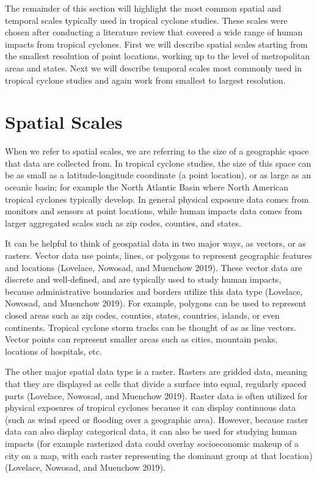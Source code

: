 \documentclass[
]{article}
\begin{document}
The remainder of this section will highlight the most common spatial and
temporal scales typically used in tropical cyclone studies. These scales
were chosen after conducting a literature review that covered a wide
range of human impacts from tropical cyclones. First we will describe
spatial scales starting from the smallest resolution of point locations,
working up to the level of metropolitan areas and states. Next we will
describe temporal scales most commonly used in tropical cyclone studies
and again work from smallest to largest resolution.

\hypertarget{spatial-scales}{%
\section{Spatial Scales}\label{spatial-scales}}

When we refer to spatial scales, we are referring to the size of a
geographic space that data are collected from. In tropical cyclone
studies, the size of this space can be as small as a latitude-longitude
coordinate (a point location), or as large as an oceanic basin; for
example the North Atlantic Basin where North American tropical cyclones
typically develop. In general physical exposure data comes from monitors
and sensors at point locations, while human impacts data comes from
larger aggregated scales such as zip codes, counties, and states.

It can be helpful to think of geospatial data in two major ways, as
vectors, or as rasters. Vector data use points, lines, or polygons to
represent geographic features and locations (Lovelace, Nowosad, and
Muenchow 2019). These vector data are discrete and well-defined, and are
typically used to study human impacts, because administrative boundaries
and borders utilize this data type (Lovelace, Nowosad, and Muenchow
2019). For example, polygons can be used to represent closed areas such
as zip codes, counties, states, countries, islands, or even continents.
Tropical cyclone storm tracks can be thought of as as line vectors.
Vector points can represent smaller areas such as cities, mountain
peaks, locations of hospitals, etc.

The other major spatial data type is a raster. Rasters are gridded data,
meaning that they are displayed as cells that divide a surface into
equal, regularly spaced parts (Lovelace, Nowosad, and Muenchow 2019).
Raster data is often utilized for physical exposures of tropical
cyclones because it can display continuous data (such as wind speed or
flooding over a geographic area). However, because raster data can also
display categorical data, it can also be used for studying human impacts
(for example rasterized data could overlay socioeconomic makeup of a
city on a map, with each raster representing the dominant group at that
location) (Lovelace, Nowosad, and Muenchow 2019).
\end{document}
